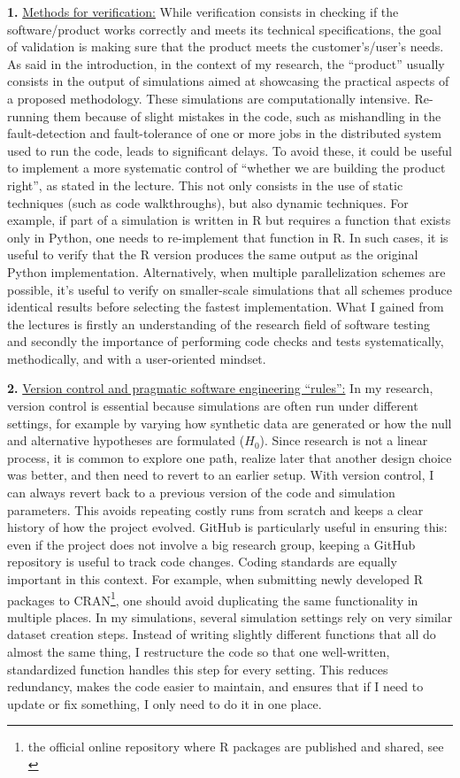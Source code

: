 \textbf{1.} \underline{Methods for verification:} While verification consists in checking if the software/product works correctly and meets its technical specifications, the goal of validation is making sure that the product meets the customer’s/user’s needs. As said in the introduction, in the context of my research, the “product” usually consists in the output of simulations aimed at showcasing the practical aspects of a proposed methodology. These simulations are computationally intensive. Re-running them because of slight mistakes in the code, such as mishandling in the fault-detection and fault-tolerance of one or more jobs in the distributed system used to run the code, leads to significant delays. To avoid these, it could be useful to implement a more systematic control of “whether we are building the product right”, as stated in the lecture. This not only consists in the use of static techniques (such as code walkthroughs), but also dynamic techniques. For example, if part of a simulation is written in R but requires a function that exists only in Python, one needs to re-implement that function in R. In such cases, it is useful to verify that the R version produces the same output as the original Python implementation. Alternatively, when multiple parallelization schemes are possible, it's useful to verify on smaller-scale simulations that all schemes produce identical results before selecting the fastest implementation. What I gained from the lectures is firstly an understanding of the research field of software testing and secondly the importance of performing code checks and tests systematically, methodically, and with a user-oriented mindset.\par\vspace{0.7em}
\noindent
\textbf{2.} \underline{Version control and pragmatic software engineering “rules”:} In my research, version control is essential because simulations are often run under different settings, for example by varying how synthetic data are generated or how the null and alternative hypotheses are formulated ($H_0$). Since research is not a linear process, it is common to explore one path, realize later that another design choice was better, and then need to revert to an earlier setup. With version control, I can always revert back to a previous version of the code and simulation parameters. This avoids repeating costly runs from scratch and keeps a clear history of how the project evolved. GitHub is particularly useful in ensuring this: even if the project does not involve a big research group, keeping a GitHub repository is useful to track code changes.
Coding standards are equally important in this context. For example, when submitting newly developed R packages to CRAN\footnote{the official online repository where R packages are published and shared, see \cite{cran}}, one should avoid duplicating the same functionality in multiple places. In my simulations, several simulation settings rely on very similar dataset creation steps. Instead of writing slightly different functions that all do almost the same thing, I restructure the code so that one well-written, standardized function handles this step for every setting. This reduces redundancy, makes the code easier to maintain, and ensures that if I need to update or fix something, I only need to do it in one place.
